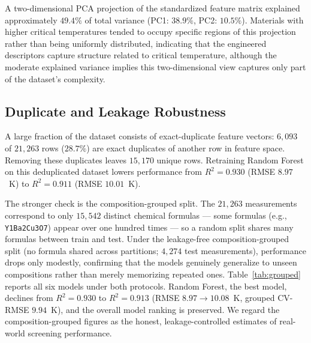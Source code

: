 \documentclass[11pt]{article}
\begin{document}
A two-dimensional PCA projection of the standardized feature matrix explained approximately $49.4\%$ of
total variance (PC1: $38.9\%$, PC2: $10.5\%$). Materials with higher critical temperatures tended to
occupy specific regions of this projection rather than being uniformly distributed, indicating that the
engineered descriptors capture structure related to critical temperature, although the moderate explained
variance implies this two-dimensional view captures only part of the dataset's complexity.

\subsection{Duplicate and Leakage Robustness}
A large fraction of the dataset consists of exact-duplicate feature vectors: $6{,}093$ of $21{,}263$ rows
($28.7\%$) are exact duplicates of another row in feature space. Removing these duplicates leaves $15{,}170$
unique rows. Retraining Random Forest on this deduplicated dataset lowers performance from
$R^2 = 0.930$ (RMSE $8.97$~K) to $R^2 = 0.911$ (RMSE $10.01$~K).

The stronger check is the composition-grouped split. The $21{,}263$ measurements correspond to only
$15{,}542$ distinct chemical formulas --- some formulas (e.g., \texttt{Y1Ba2Cu3O7}) appear over one hundred
times --- so a random split shares many formulas between train and test. Under the leakage-free
composition-grouped split (no formula shared across partitions; $4{,}274$ test measurements),
performance drops only modestly, confirming that the models genuinely generalize to unseen compositions
rather than merely memorizing repeated ones. Table~\ref{tab:grouped} reports all six models under both
protocols. Random Forest, the best model, declines from $R^2 = 0.930$ to $R^2 = 0.913$
(RMSE $8.97 \to 10.08$~K, grouped CV-RMSE $9.94$~K), and the overall model ranking is preserved. We regard
the composition-grouped figures as the honest, leakage-controlled estimates of real-world screening
performance.
\end{document}
